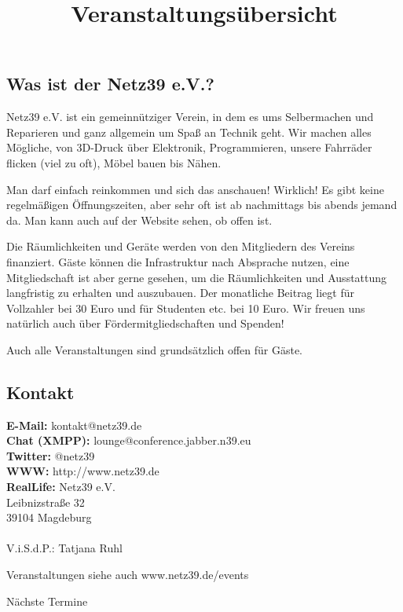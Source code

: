 \documentclass[\VAR{docclass}]{../LatexTemplate/netz39} %
\begin{document}
	
\title{Veranstaltungsübersicht}{ }

\begin{about}
	\section{Was ist der Netz39 e.V.?}
Netz39 e.V. ist ein gemeinnütziger Verein, in dem es ums Selbermachen und Reparieren und ganz allgemein um Spaß an Technik geht. Wir machen alles Mögliche, von 3D-Druck über Elektronik, Programmieren, unsere Fahrräder flicken (viel zu oft), Möbel bauen bis Nähen. 

Man darf einfach reinkommen und sich das anschauen! Wirklich! Es gibt keine regelmäßigen Öffnungszeiten, aber sehr oft ist ab nachmittags bis abends jemand da. Man kann auch auf der Website sehen, ob offen ist.

Die Räumlichkeiten und Geräte werden von den Mitgliedern des Vereins finanziert. Gäste können die Infrastruktur nach Absprache nutzen, eine Mitgliedschaft ist aber gerne gesehen, um die Räumlichkeiten und Ausstattung langfristig zu erhalten und auszubauen. Der monatliche Beitrag liegt für Vollzahler bei 30 Euro und für Studenten etc. bei 10 Euro. Wir freuen uns natürlich auch über Fördermitgliedschaften und Spenden!

Auch alle Veranstaltungen sind grundsätzlich offen für Gäste.
\end{about}

\begin{contact}
	\section{Kontakt}
	\textbf{E-Mail:} kontakt@netz39.de\\
	\textbf{Chat (XMPP):} lounge@conference.jabber.n39.eu\\
	\textbf{Twitter:} @netz39\\
	\textbf{WWW:} http://www.netz39.de\\
	\textbf{RealLife:} Netz39 e.V.\\
	Leibnizstraße 32\\
	39104 Magdeburg\\\\
	V.i.S.d.P.: Tatjana Ruhl
\end{contact}


\begin{entry}{Veranstaltungen}
siehe auch www.netz39.de/events
\end{entry}

\begin{entry}{}
	\begin{events}{Nächste Termine}
		\event {}
	\end{events}
\end{entry}

\end{document}
